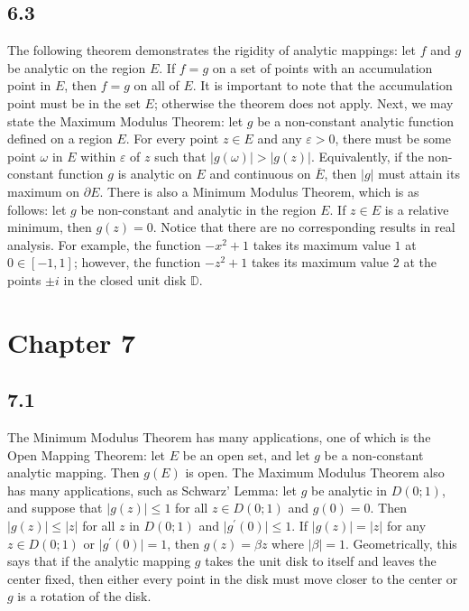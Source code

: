 \documentclass[12pt]{article}
\begin{document}
\subsection*{6.3}
The following theorem demonstrates the rigidity of analytic mappings: let $f$ and $g$ be analytic on the region $E$. If $f = g$ on a set of points with an accumulation point in $E$, then $f=g$ on all of $E$. It is important to note that the accumulation point must be in the set $E$; otherwise the theorem does not apply. Next, we may state the Maximum Modulus Theorem: let $g$ be a non-constant analytic function defined on a region $E$. For every point $z \in E$ and any $\varepsilon > 0$, there must be some point $\omega$ in $E$ within $\varepsilon$ of $z$ such that $\vert g(\omega) \vert > \vert g(z) \vert$. Equivalently, if the non-constant function $g$ is analytic on $E$ and continuous on $\overline{E}$, then $\vert g\vert$ must attain its maximum on $\partial{E}$. There is also a Minimum Modulus Theorem, which is as follows: let $g$ be non-constant and analytic in the region $E$. If $z \in E$ is a relative minimum, then $g(z) = 0$. Notice that there are no corresponding results in real analysis. For example, the function $-x^2+1$ takes its maximum value $1$ at $0 \in [-1,1]$; however, the function $-z^2 + 1$ takes its maximum value $2$ at the points $\pm i$ in the closed unit disk $\mathbb{D}$.
\section*{Chapter 7}
\subsection*{7.1}
The Minimum Modulus Theorem has many applications, one of which is the Open Mapping Theorem: let $E$ be an open set, and let $g$ be a non-constant analytic mapping. Then $g(E)$ is open. The Maximum Modulus Theorem also has many applications, such as Schwarz' Lemma: let $g$ be analytic in $D(0;1)$, and suppose that $\vert g(z) \vert \leq 1$ for all $z \in D(0;1)$ and $g(0) = 0$. Then $\vert g(z) \vert \leq \vert z \vert$ for all $z$ in $D(0;1)$ and $\vert g^\prime(0) \vert \leq 1$. If $\vert g(z) \vert =  \vert z \vert$ for any $z \in D(0;1)$ or $\vert g^\prime(0) \vert = 1$, then $g(z) = \beta z$ where $\vert \beta \vert = 1$. Geometrically, this says that if the analytic mapping $g$ takes the unit disk to itself and leaves the center fixed, then either every point in the disk must move closer to the center or $g$ is a rotation of the disk.
\end{document}
